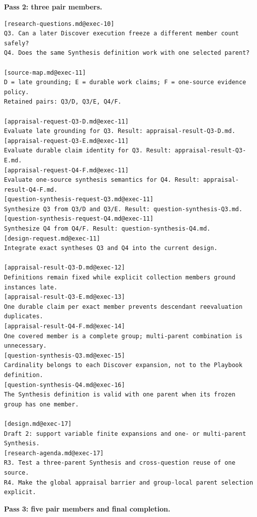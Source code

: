 \documentclass[11pt]{article}
\begin{document}
\medskip
\noindent\textbf{Pass 2: three pair members.}\par\smallskip

\begin{lstlisting}[style=playbook,basicstyle=\ttfamily\scriptsize]
[research-questions.md@exec-10]
Q3. Can a later Discover execution freeze a different member count safely?
Q4. Does the same Synthesis definition work with one selected parent?

[source-map.md@exec-11]
D = late grounding; E = durable work claims; F = one-source evidence policy.
Retained pairs: Q3/D, Q3/E, Q4/F.

[appraisal-request-Q3-D.md@exec-11]
Evaluate late grounding for Q3. Result: appraisal-result-Q3-D.md.
[appraisal-request-Q3-E.md@exec-11]
Evaluate durable claim identity for Q3. Result: appraisal-result-Q3-E.md.
[appraisal-request-Q4-F.md@exec-11]
Evaluate one-source synthesis semantics for Q4. Result: appraisal-result-Q4-F.md.
[question-synthesis-request-Q3.md@exec-11]
Synthesize Q3 from Q3/D and Q3/E. Result: question-synthesis-Q3.md.
[question-synthesis-request-Q4.md@exec-11]
Synthesize Q4 from Q4/F. Result: question-synthesis-Q4.md.
[design-request.md@exec-11]
Integrate exact syntheses Q3 and Q4 into the current design.

[appraisal-result-Q3-D.md@exec-12]
Definitions remain fixed while explicit collection members ground instances late.
[appraisal-result-Q3-E.md@exec-13]
One durable claim per exact member prevents descendant reevaluation duplicates.
[appraisal-result-Q4-F.md@exec-14]
One covered member is a complete group; multi-parent combination is unnecessary.
[question-synthesis-Q3.md@exec-15]
Cardinality belongs to each Discover expansion, not to the Playbook definition.
[question-synthesis-Q4.md@exec-16]
The Synthesis definition is valid with one parent when its frozen group has one member.

[design.md@exec-17]
Draft 2: support variable finite expansions and one- or multi-parent Synthesis.
[research-agenda.md@exec-17]
R3. Test a three-parent Synthesis and cross-question reuse of one source.
R4. Make the global appraisal barrier and group-local parent selection explicit.
\end{lstlisting}

\medskip
\noindent\textbf{Pass 3: five pair members and final completion.}\par\smallskip
\end{document}
